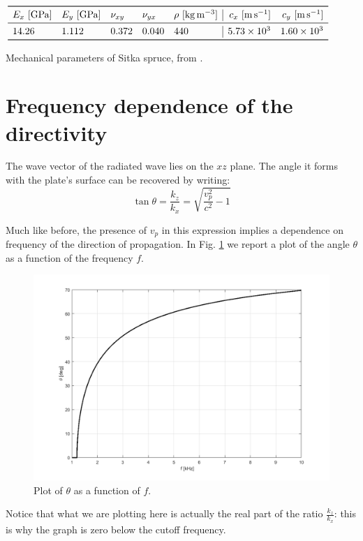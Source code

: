 \documentclass[a4paper]{article}
\begin{document}
\begin{table}[h]
	\centering
	$\begin{array}{lllll|rr}
		\toprule
		E_x~[\si{\giga\pascal]}& E_y~[\si{\giga\pascal}] & \nu_{xy} & \nu_{yx} & \rho~[\si{\kilogram\per\meter\cubed}] & c_x~[\si{\meter\per\second}] &  c_y~[\si{\meter\per\second}]\\
		\midrule
		14.26 & 1.112 & 0.372 & 0.040 & 440 & 5.73\times10^3 & 1.60\times10^3\\
		\bottomrule
	\end{array}$
	\caption{Mechanical parameters of Sitka spruce, from \cite{wood}.}
	\label{tab:wood}
\end{table}

\section{Frequency dependence of the directivity}

The wave vector of the radiated wave lies on the $xz$ plane. The angle it forms with the plate's surface can be recovered by writing:
$$ \tan \theta = \frac{k_z}{k_x} = \sqrt{\frac{v_p^2}{c^2} - 1} $$

Much like before, the presence of $v_p$ in this expression implies a dependence on frequency of the direction of propagation. In Fig. \ref{fig:dir} we report a plot of the angle $\theta$ as a function of the frequency $f$.

\begin{figure}[h]
	\centering
	\includegraphics[width=0.8\linewidth]{lindir.png}
	\caption{Plot of $\theta$ as a function of $f$.}
	\label{fig:dir}
\end{figure}
Notice that what we are plotting here is actually the real part of the ratio $\frac{k_z}{k_x}$: this is why the graph is zero below the cutoff frequency.
\end{document}
